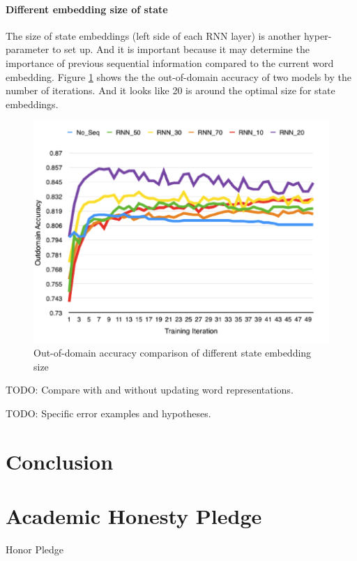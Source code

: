 \documentclass[11pt]{article}
\begin{document}
\paragraph{Different embedding size of state}
The size of state embeddings (left side of each RNN layer) is another hyper-parameter to set up. And it is important because it may determine the importance of previous sequential information compared to the current word embedding. Figure \ref{Leftsize_fig} shows the the out-of-domain accuracy of two models by the number of iterations. And it looks like 20 is around the optimal size for state embeddings.
\begin{figure}
	\includegraphics[scale=0.5]{outdomain_leftsize.png}
	\caption{Out-of-domain accuracy comparison of different state embedding size} \label{Leftsize_fig}
\end{figure}

TODO: Compare with and without updating word representations.


TODO: Specific error examples and hypotheses.





\section{Conclusion}

\section{Academic Honesty Pledge}

Honor Pledge
\end{document}
